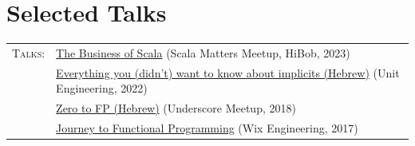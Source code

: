 \documentclass[a4paper,11pt]{article}
\begin{document}
\section{Selected Talks}
\begin{tabular}{rl}
  \textsc{Talks:}&\faYoutubePlay{} \href{https://www.youtube.com/watch?v=eILoMm9t4rI}{The Business of Scala} (Scala Matters Meetup, HiBob, 2023)\\
  &\faYoutubePlay{} \href{https://www.youtube.com/watch?v=qBmZJwmd0CA}{Everything you (didn't) want to know about implicits (Hebrew)} (Unit Engineering, 2022)\\
  &\faYoutubePlay{} \href{https://www.youtube.com/watch?v=N6ZJwnvTjLA}{Zero to FP (Hebrew)} (Underscore Meetup, 2018)\\
  &\faYoutubePlay{} \href{https://www.youtube.com/watch?v=g1EvM4CbUvM}{Journey to Functional Programming} (Wix Engineering, 2017)\\
\end{tabular}

\endgroup
\end{document}
